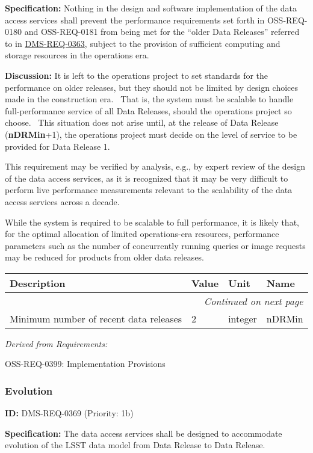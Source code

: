 \documentclass[SE,toc,lsstdraft]{lsstdoc}
\makeatletter
\newcommand{\paramname}[1]{\hspace{0pt}#1}
\newcommand{\unitname}[1]{\hspace{0pt}#1}
\newenvironment{parameters}[0]{%
\setlength\LTleft{0pt}
\setlength\LTright{\fill}
\begin{small}
\begin{longtable}[]{|p{0.49\textwidth}|l|p{0.6in}|p{1.70in}@{}|}

\hline \textbf{Description} & \textbf{Value} & \textbf{Unit} & \textbf{Name} \\ \hline
\endhead

\hline \multicolumn{4}{r}{\emph{Continued on next page}} \\
\endfoot

\hline\hline
\endlastfoot
}{%
\hline
\end{longtable}
\end{small}
}
\makeatother
\begin{document}
\textbf{Specification:}
Nothing in the design and software implementation of the data access services shall prevent the performance requirements set forth in OSS-REQ-0180 and OSS-REQ-0181 from being met for the “older Data Releases” referred to in \hyperref[DMS-REQ-0363]{DMS-REQ-0363}, subject to the provision of sufficient computing and storage resources in the operations era.

\textbf{Discussion:}
It is left to the operations project to set standards for the performance on older releases, but they should not be limited by design choices made in the construction era.  That is, the system must be scalable to handle full-performance service of all Data Releases, should the operations project so choose.  This situation does not arise until, at the release of Data Release (\textbf{nDRMin}+1), the operations project must decide on the level of service to be provided for Data Release 1.

This requirement may be verified by analysis, e.g., by expert review of the design of the data access services, as it is recognized that it may be very difficult to perform live performance measurements relevant to the scalability of the data access services across a decade.

While the system is required to be scalable to full performance, it is likely that, for the optimal allocation of limited operations-era resources, performance parameters such as the number of concurrently running queries or image requests may be reduced for products from older data releases.

\begin{parameters}
Minimum number of recent data releases
&
2
&
\unitname{%
integer
}
&
\paramname{%
nDRMin
} \\\hline
\end{parameters}

\emph{Derived from Requirements:}

OSS-REQ-0399:
Implementation Provisions \newline

\subsubsection{Evolution}

\label{DMS-REQ-0369}
\textbf{ID:} DMS-REQ-0369 (Priority: 1b)

\textbf{Specification:}
The data access services shall be designed to accommodate evolution of the LSST data model from Data Release to Data Release.
\end{document}
